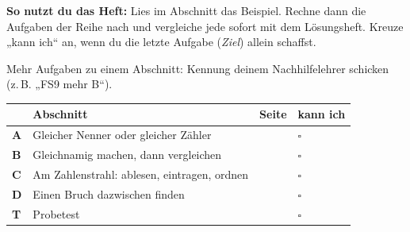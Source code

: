 \documentclass[11pt]{article}
\begin{document}
\par\smallskip
{}\par\medskip
\noindent\textbf{So nutzt du das Heft:} Lies im Abschnitt das Beispiel. Rechne dann die Aufgaben der Reihe nach und vergleiche jede sofort mit dem Lösungsheft. Kreuze „kann ich“ an, wenn du die letzte Aufgabe (\emph{Ziel}) allein schaffst.\par
\noindent Mehr Aufgaben zu einem Abschnitt: Kennung deinem Nachhilfelehrer schicken (z.\,B. „FS9 mehr B“).\par\medskip
{\renewcommand{\arraystretch}{1.3}
\noindent\begin{tabular}{|>{\bfseries}p{10mm}|p{112mm}|>{\raggedleft\arraybackslash}p{10mm}|>{\centering\arraybackslash}p{14mm}|}\hline
\rowcolor{black!8} & \textbf{Abschnitt} & \textbf{Seite} & \textbf{kann ich}\\\hline
A & Gleicher Nenner oder gleicher Zähler & \pageref{s:A} & $\square$\\\hline
B & Gleichnamig machen, dann vergleichen & \pageref{s:B} & $\square$\\\hline
C & Am Zahlenstrahl: ablesen, eintragen, ordnen & \pageref{s:C} & $\square$\\\hline
D & Einen Bruch dazwischen finden & \pageref{s:D} & $\square$\\\hline
T & Probetest & \pageref{s:T} & $\square$\\\hline
\end{tabular}}\par\bigskip
\end{document}
